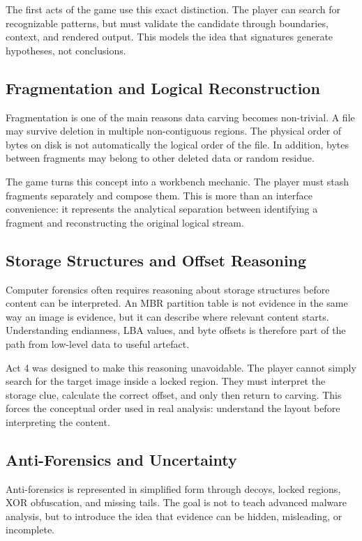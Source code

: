 \documentclass[11pt,a4paper]{article}
\begin{document}
The first acts of the game use this exact distinction. The player can search for recognizable patterns, but must validate the candidate through boundaries, context, and rendered output. This models the idea that signatures generate hypotheses, not conclusions.

\subsection{Fragmentation and Logical Reconstruction}

Fragmentation is one of the main reasons data carving becomes non-trivial. A file may survive deletion in multiple non-contiguous regions. The physical order of bytes on disk is not automatically the logical order of the file. In addition, bytes between fragments may belong to other deleted data or random residue.

The game turns this concept into a workbench mechanic. The player must stash fragments separately and compose them. This is more than an interface convenience: it represents the analytical separation between identifying a fragment and reconstructing the original logical stream.

\subsection{Storage Structures and Offset Reasoning}

Computer forensics often requires reasoning about storage structures before content can be interpreted. An MBR partition table is not evidence in the same way an image is evidence, but it can describe where relevant content starts. Understanding endianness, LBA values, and byte offsets is therefore part of the path from low-level data to useful artefact.

Act 4 was designed to make this reasoning unavoidable. The player cannot simply search for the target image inside a locked region. They must interpret the storage clue, calculate the correct offset, and only then return to carving. This forces the conceptual order used in real analysis: understand the layout before interpreting the content.

\subsection{Anti-Forensics and Uncertainty}

Anti-forensics is represented in simplified form through decoys, locked regions, XOR obfuscation, and missing tails. The goal is not to teach advanced malware analysis, but to introduce the idea that evidence can be hidden, misleading, or incomplete.
\end{document}
